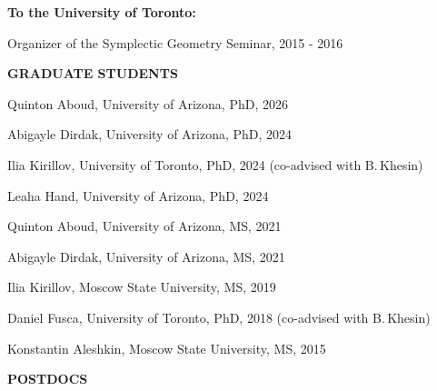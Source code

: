 \documentclass[a4paper, 12pt]{article}
\begin{document}
 \par\smallskip
\textbf{To the University of Toronto:}
\begin{compactitem}
\item Organizer of the {Symplectic Geometry Seminar}, 2015 - 2016
\end{compactitem}
\par\quad\par\smallskip
\textbf{GRADUATE STUDENTS} \par\smallskip
\begin{compactitem}
\item  Quinton Aboud, University of Arizona, PhD, 2026
\item Abigayle Dirdak, University of Arizona, PhD, 2024
\item Ilia Kirillov, University of Toronto, PhD, 2024 (co-advised with B.\,Khesin)
\item  Leaha Hand, University of Arizona, PhD, 2024
\item  Quinton Aboud, University of Arizona, MS, 2021
\item Abigayle Dirdak, University of Arizona, MS, 2021
\item Ilia Kirillov, Moscow State University, MS, 2019
\item Daniel Fusca, University of Toronto, PhD, 2018 (co-advised with B.\,Khesin)
\item Konstantin Aleshkin, Moscow State University, MS, 2015



\end{compactitem}
\par\quad\par
\textbf{POSTDOCS} \par\smallskip
\end{document}
